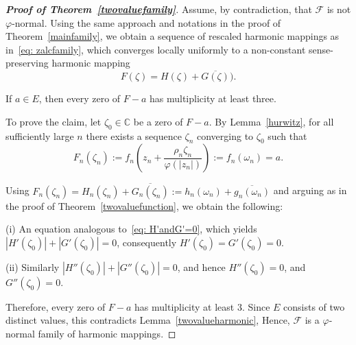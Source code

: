 \documentclass[11pt, reqno]{amsart}
\numberwithin{equation}{section}
\theoremstyle{definition}
\theoremstyle{remark}
\theoremstyle{plain}
\begin{document}
\begin{proof}[\bf{Proof of Theorem~\ref{twovaluefamily}}]
  Assume, by contradiction, that $\mathcal{F}$ is not $\varphi$-normal.
  Using the same approach and notations in the proof of 
  Theorem~\ref{mainfamily}, we obtain
   a sequence of rescaled harmonic mappings as in~\eqref{eq: zalcfamily}, which
  converges locally uniformly to a non-constant sense-preserving
  harmonic mapping
  \[
  F(\zeta)=H(\zeta)+\overline{G(\zeta)}).
  \] 

 If $a\in E$, then every zero of $F-a$ has 
multiplicity at least three.

 To prove the claim, let
  $\zeta_0\in \mathbb{C}$ be a zero of $F-a$. By 
  Lemma~\ref{hurwitz}, for all sufficiently large $n$ 
there exists a sequence $\zeta_n$ 
converging to $\zeta_0$ such that
  \[F_n(\zeta_n):=f_n\!\left(z_n+\frac{\rho_n\zeta_n}
{\varphi(|z_n|)}\right):=f_n(\omega_n)=a.
  \]

Using $F_n(\zeta_n)=H_n(\zeta_n)+\overline{G_n(\zeta_n)}:=
 h_n(\omega_n)+\overline{g_n(\omega_n)}$ and arguing as in the proof of 
 Theorem~\ref{twovaluefunction}, we obtain the following: \smallskip
 
\noindent (i) An equation analogous to~\eqref{eq: H'andG'=0}, which yields
$|H'(\zeta_0)|+|G'(\zeta_0)|=0$,  consequently $H'(\zeta_0)=G'(\zeta_0)=0.$

\noindent (ii) Similarly $|H''(\zeta_0)|+|G''(\zeta_0)|=0$, and hence
$H''(\zeta_0)=0$, 
and $G''(\zeta_0)=0$.\smallskip

 Therefore, every zero of $F-a$ has multiplicity at least 3. Since $E$ 
  consists of two distinct values, this contradicts Lemma~\ref{twovalueharmonic}, 
  Hence, $\mathcal{F}$ is a $\varphi$-normal family of harmonic mappings.
\end{proof}
\medskip
\end{document}
